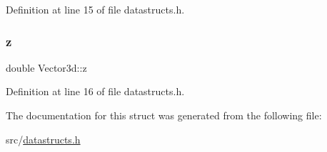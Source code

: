 Definition at line 15 of file datastructs.\+h.

\mbox{\label{struct_vector3d_acda14a15e061a330d4ada509c9357c30}} 
\subsubsection{\texorpdfstring{z}{z}}
{\footnotesize\ttfamily double Vector3d\+::z}



Definition at line 16 of file datastructs.\+h.



The documentation for this struct was generated from the following file\+:\begin{DoxyCompactItemize}
\item 
src/\mbox{\hyperlink{datastructs_8h}{datastructs.\+h}}\end{DoxyCompactItemize}

